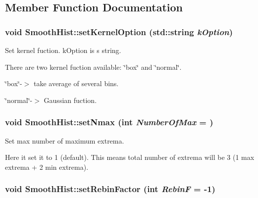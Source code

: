 \subsection{Member Function Documentation}
\hypertarget{classSmoothHist_a400870adb6f812cfb5fcba450d645703}{
\subsubsection[{setKernelOption}]{\setlength{\rightskip}{0pt plus 5cm}void SmoothHist::setKernelOption (std::string {\em kOption})}}
\label{classSmoothHist_a400870adb6f812cfb5fcba450d645703}
Set kernel fuction. kOption is s string.\par
 There are two kernel fuction available: \char`\"{}box\char`\"{} and \char`\"{}normal\char`\"{}.\par
 \char`\"{}box\char`\"{}-\/$>$ take average of several bins.\par
 \char`\"{}normal\char`\"{}-\/$>$ Gaussian fuction.\par
 \hypertarget{classSmoothHist_afa0d953e55d55dc4216fe508c03b7c44}{
\subsubsection[{setNmax}]{\setlength{\rightskip}{0pt plus 5cm}void SmoothHist::setNmax (int {\em NumberOfMax} = {})}}
\label{classSmoothHist_afa0d953e55d55dc4216fe508c03b7c44}
Set max number of maximum extrema.\par
 Here it set it to 1 (default). This means total number of extrema will be 3 (1 max extrema + 2 min extrema). \hypertarget{classSmoothHist_a547095b0168773a9c913001f2426a7b2}{
\subsubsection[{setRebinFactor}]{\setlength{\rightskip}{0pt plus 5cm}void SmoothHist::setRebinFactor (int {\em RebinF} = {\ttfamily -\/1})}}

